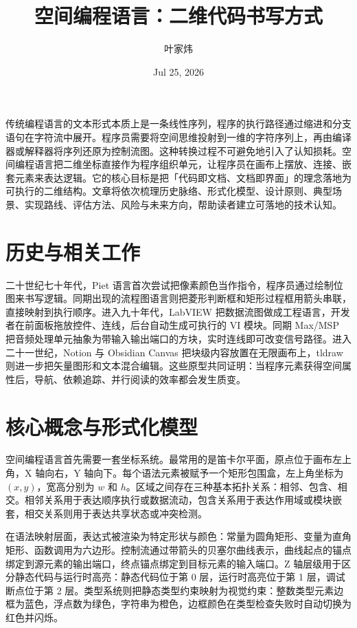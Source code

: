 \title{空间编程语言：二维代码书写方式}
\author{叶家炜}
\date{Jul 25, 2026}
\maketitle
传统编程语言的文本形式本质上是一条线性序列，程序的执行路径通过缩进和分支语句在字符流中展开。程序员需要将空间思维投射到一维的字符序列上，再由编译器或解释器将序列还原为控制流图。这种转换过程不可避免地引入了认知损耗。空间编程语言把二维坐标直接作为程序组织单元，让程序员在画布上摆放、连接、嵌套元素来表达逻辑。它的核心目标是把「代码即文档、文档即界面」的理念落地为可执行的二维结构。文章将依次梳理历史脉络、形式化模型、设计原则、典型场景、实现路线、评估方法、风险与未来方向，帮助读者建立可落地的技术认知。\par
\chapter{历史与相关工作}
二十世纪七十年代，Piet 语言首次尝试把像素颜色当作指令，程序员通过绘制位图来书写逻辑。同期出现的流程图语言则把菱形判断框和矩形过程框用箭头串联，直接映射到执行顺序。进入九十年代，LabVIEW 把数据流图做成工程语言，开发者在前面板拖放控件、连线，后台自动生成可执行的 VI 模块。同期 Max/MSP 把音频处理单元抽象为带输入输出端口的方块，实时连线即可改变信号路径。进入二十一世纪，Notion 与 Obsidian Canvas 把块级内容放置在无限画布上，tldraw 则进一步把矢量图形和文本混合编辑。这些原型共同证明：当程序元素获得空间属性后，导航、依赖追踪、并行阅读的效率都会发生质变。\par
\chapter{核心概念与形式化模型}
空间编程语言首先需要一套坐标系统。最常用的是笛卡尔平面，原点位于画布左上角，X 轴向右，Y 轴向下。每个语法元素被赋予一个矩形包围盒，左上角坐标为 $\left(x,y\right)$，宽高分别为 $w$ 和 $h$。区域之间存在三种基本拓扑关系：相邻、包含、相交。相邻关系用于表达顺序执行或数据流动，包含关系用于表达作用域或模块嵌套，相交关系则用于表达共享状态或冲突检测。\par
在语法映射层面，表达式被渲染为特定形状与颜色：常量为圆角矩形、变量为直角矩形、函数调用为六边形。控制流通过带箭头的贝塞尔曲线表示，曲线起点的锚点绑定到源元素的输出端口，终点锚点绑定到目标元素的输入端口。Z 轴层级用于区分静态代码与运行时高亮：静态代码位于第 0 层，运行时高亮位于第 1 层，调试断点位于第 2 层。类型系统则把静态类型约束映射为视觉约束：整数类型元素边框为蓝色，浮点数为绿色，字符串为橙色，边框颜色在类型检查失败时自动切换为红色并闪烁。\par
